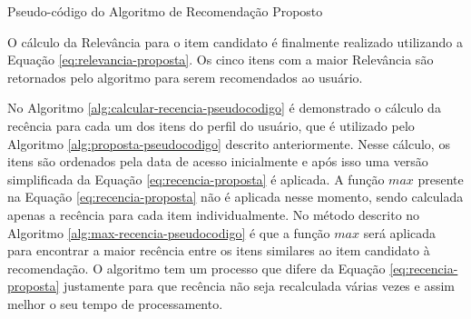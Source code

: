 \begin{algorithm}
  \caption{Pseudo-código do Algoritmo de Recomendação Proposto \label{alg:proposta-pseudocodigo}}


\end{algorithm}

O cálculo da Relevância para o item candidato é finalmente realizado utilizando a Equação \ref{eq:relevancia-proposta}. Os cinco
itens com a maior Relevância são retornados pelo algoritmo para serem recomendados ao usuário.

No Algoritmo \ref{alg:calcular-recencia-pseudocodigo} é demonstrado o cálculo da recência para cada um dos itens do perfil do
usuário, que é utilizado pelo Algoritmo \ref{alg:proposta-pseudocodigo} descrito anteriormente. Nesse cálculo, os itens são
ordenados pela data de acesso inicialmente e após isso uma versão simplificada da Equação \ref{eq:recencia-proposta} é aplicada.
A função $max$ presente na Equação \ref{eq:recencia-proposta} não é aplicada nesse momento, sendo calculada apenas a recência
para cada item individualmente. No método descrito no Algoritmo \ref{alg:max-recencia-pseudocodigo} é que a função $max$ será
aplicada para encontrar a maior recência entre os itens similares ao item candidato à recomendação. O algoritmo tem um processo
que difere da Equação \ref{eq:recencia-proposta} justamente para que recência não seja recalculada várias vezes e assim
melhor o seu tempo de processamento.

